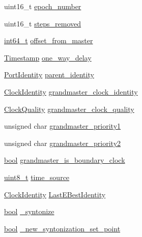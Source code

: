 \begin{DoxyCompactItemize}
\item 
uint16\+\_\+t \hyperlink{class_i_e_e_e1588_clock_a173a222571e06b971b91262347a350fd}{epoch\+\_\+number}
\item 
uint16\+\_\+t \hyperlink{class_i_e_e_e1588_clock_ace02db8080fa03d9670d0a3de68161c2}{steps\+\_\+removed}
\item 
\hyperlink{parse_8c_a67a9885ef4908cb72ce26d75b694386c}{int64\+\_\+t} \hyperlink{class_i_e_e_e1588_clock_ab5f283114581e578de7b7bc9b016e3b6}{offset\+\_\+from\+\_\+master}
\item 
\hyperlink{class_timestamp}{Timestamp} \hyperlink{class_i_e_e_e1588_clock_a5a4bd75d495b6d9d4fa79d6c14cc6584}{one\+\_\+way\+\_\+delay}
\item 
\hyperlink{class_port_identity}{Port\+Identity} \hyperlink{class_i_e_e_e1588_clock_a5390ac626c54d20e32c622d31b05049c}{parent\+\_\+identity}
\item 
\hyperlink{class_clock_identity}{Clock\+Identity} \hyperlink{class_i_e_e_e1588_clock_a4cfda330972625c998f486c38a8b1532}{grandmaster\+\_\+clock\+\_\+identity}
\item 
\hyperlink{struct_clock_quality}{Clock\+Quality} \hyperlink{class_i_e_e_e1588_clock_a76c6bc5613865d52fb061b609c769bae}{grandmaster\+\_\+clock\+\_\+quality}
\item 
unsigned char \hyperlink{class_i_e_e_e1588_clock_ac43f72ca0d3a90bad60c3d633c32e659}{grandmaster\+\_\+priority1}
\item 
unsigned char \hyperlink{class_i_e_e_e1588_clock_a8ae8e42a0c024902bc4b22275064bf57}{grandmaster\+\_\+priority2}
\item 
\hyperlink{avb__gptp_8h_af6a258d8f3ee5206d682d799316314b1}{bool} \hyperlink{class_i_e_e_e1588_clock_a45d9d693225e2f0f0e6b6212992836f8}{grandmaster\+\_\+is\+\_\+boundary\+\_\+clock}
\item 
\hyperlink{stdint_8h_aba7bc1797add20fe3efdf37ced1182c5}{uint8\+\_\+t} \hyperlink{class_i_e_e_e1588_clock_aca8fb87cde2fc6c2f46e7332b5b8f1b8}{time\+\_\+source}
\item 
\hyperlink{class_clock_identity}{Clock\+Identity} \hyperlink{class_i_e_e_e1588_clock_aecec9d272ce3010f56716cdaf7bd1e5c}{Last\+E\+Best\+Identity}
\item 
\hyperlink{avb__gptp_8h_af6a258d8f3ee5206d682d799316314b1}{bool} \hyperlink{class_i_e_e_e1588_clock_a0622d210cf26a0695cf8bd6fa01fb46b}{\+\_\+syntonize}
\item 
\hyperlink{avb__gptp_8h_af6a258d8f3ee5206d682d799316314b1}{bool} \hyperlink{class_i_e_e_e1588_clock_a072a8e01c4846e8dac776efb649eecaa}{\+\_\+new\+\_\+syntonization\+\_\+set\+\_\+point}

\end{DoxyCompactItemize}
